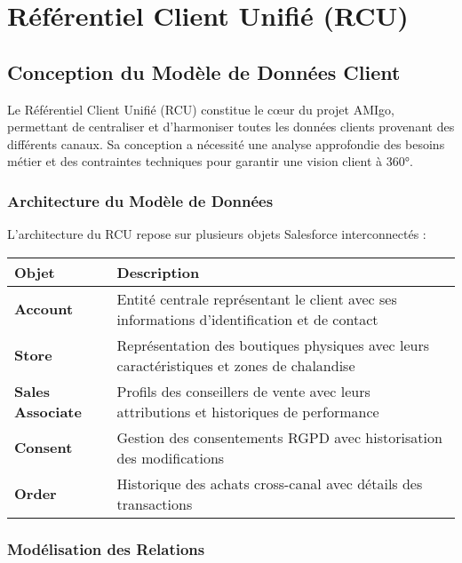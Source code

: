 
\chapter{Référentiel Client Unifié (RCU)}

\section{Conception du Modèle de Données Client}

\begin{mdframed}[backgroundcolor=lightgreen!20, linewidth=1pt]
Le Référentiel Client Unifié (RCU) constitue le cœur du projet AMIgo, permettant de centraliser et d'harmoniser toutes les données clients provenant des différents canaux. Sa conception a nécessité une analyse approfondie des besoins métier et des contraintes techniques pour garantir une vision client à 360°.
\end{mdframed}

\subsection{Architecture du Modèle de Données}

L'architecture du RCU repose sur plusieurs objets Salesforce interconnectés :

\begin{center}
\begin{tabular}{|>{\bfseries}p{4cm}|p{9.5cm}|}
\hline
\rowcolor{lightblue} Objet & Description \\
\hline
Account & Entité centrale représentant le client avec ses informations d'identification et de contact \\
\hline
Store & Représentation des boutiques physiques avec leurs caractéristiques et zones de chalandise \\
\hline
Sales Associate & Profils des conseillers de vente avec leurs attributions et historiques de performance \\
\hline
Consent & Gestion des consentements RGPD avec historisation des modifications \\
\hline
Order & Historique des achats cross-canal avec détails des transactions \\
\hline
\end{tabular}
\end{center}

\subsection{Modélisation des Relations}

